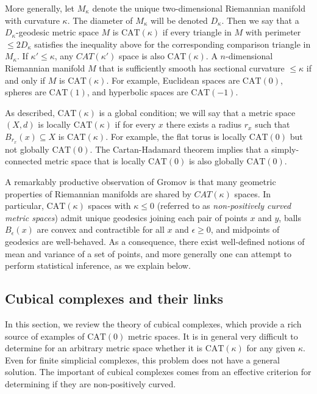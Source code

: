 \documentclass[a4paper,11pt]{article}
\newcommand{\CAT}{\textrm{CAT}}
\begin{document}
More generally, let $M_{\kappa}$ denote the unique two-dimensional Riemannian manifold with curvature $\kappa$.
The diameter of $M_{\kappa}$ will be denoted $D_{\kappa}$.
Then we say that a $D_{\kappa}$-geodesic metric space $M$ is $\CAT(\kappa)$ if every triangle in $M$ with perimeter $\leq 2D_{\kappa}$ satisfies the inequality above for the corresponding comparison triangle in $M_{\kappa}$.
If $\kappa' \leq \kappa$, any $CAT(\kappa')$ space is also $\CAT(\kappa)$.
A $n$-dimensional Riemannian manifold $M$ that is sufficiently smooth has sectional curvature $\leq \kappa$ if and only if $M$ is $\CAT(\kappa)$.
For example, Euclidean spaces are $\CAT(0)$, spheres are $\CAT(1)$, and hyperbolic spaces are $\CAT(-1)$.

As described, $\CAT(\kappa)$ is a global condition; we will say that a metric space $(X,d)$ is locally $\CAT(\kappa)$ if for every $x$ there exists a radius $r_x$ such that $B_{r_x}(x) \subseteq X$ is $\CAT(\kappa)$.
For example, the flat torus is locally $\CAT(0)$ but not globally $\CAT(0)$.
The Cartan-Hadamard theorem implies that a simply-connected metric space that is locally $\CAT(0)$ is also globally $\CAT(0)$.

A remarkably productive observation of Gromov is that many geometric properties of Riemannian manifolds are shared by $CAT(\kappa)$ spaces.
In particular, $\CAT(\kappa)$ spaces with $\kappa \leq 0$ (referred to as {\em non-positively curved metric spaces}) admit unique geodesics joining each pair of points $x$ and $y$, balls $B_{\epsilon}(x)$ are convex and contractible for all $x$ and $\epsilon \geq 0$, and midpoints of geodesics are well-behaved.
As a consequence, there exist well-defined notions of mean and variance of a set of points, and more generally one can attempt to perform statistical inference, as we explain below.

\subsection{Cubical complexes and their links}

In this section, we review the theory of cubical complexes, which provide a rich source of examples of $\CAT(0)$ metric spaces.
It is in general very difficult to determine for an arbitrary metric space whether it is $\CAT(\kappa)$ for any given $\kappa$.
Even for finite simplicial complexes, this problem does not have a general solution.
The important of cubical complexes comes from an effective criterion for determining if they are non-positively curved.
\end{document}
